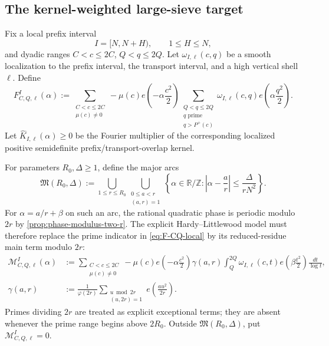 \documentclass[11pt]{article}
\theoremstyle{definition}
\theoremstyle{remark}
\newcommand{\Pplus}{P^{+}}
\newcommand{\1}{\mathbf{1}}
\begin{document}
\subsection{The kernel-weighted large-sieve target}

Fix a local prefix interval
\begin{equation}
 I=[N,N+H),
 \qquad 1\le H\le N,
 \label{eq:local-prefix-I}
\end{equation}
and dyadic ranges $C<c\le2C$, $Q<q\le2Q$.  Let
$\omega_{I,\ell}(c,q)$ be a smooth localization to the prefix interval,
the transport interval, and a high vertical shell $\ell$.  Define
\begin{equation}
 F_{C,Q,\ell}^{I}(\alpha)
 :=
 \sum_{\substack{C<c\le2C\\\mu(c)\ne0}}
 -\mu(c)e\!\left(-\alpha\frac{c^2}{2}\right)
 \sum_{\substack{Q<q\le2Q\\q\text{ prime}\\q>\Pplus(c)}}
 \omega_{I,\ell}(c,q)
 e\!\left(\alpha\frac{q^2}{2}\right).
 \label{eq:F-CQ-local}
\end{equation}
Let $\widehat K_{I,\ell}(\alpha)\ge0$ be the Fourier multiplier of the
corresponding localized positive semidefinite prefix/transport-overlap
kernel.

For parameters $R_0,\Delta\ge1$, define the major arcs
\begin{equation}
 \mathfrak M(R_0,\Delta)
 :=
 \bigcup_{1\le r\le R_0}
 \bigcup_{\substack{0\le a<r\\(a,r)=1}}
 \left\{
 \alpha\in\mathbb R/\mathbb Z:
 \left|\alpha-\frac ar\right|
 \le\frac{\Delta}{rN^2}
 \right\}.
 \label{eq:major-arcs}
\end{equation}
For $\alpha=a/r+\beta$ on such an arc, the rational quadratic phase is
periodic modulo $2r$ by \cref{prop:phase-modulus-two-r}.  The explicit
Hardy--Littlewood model must therefore replace the prime indicator in
\cref{eq:F-CQ-local} by its reduced-residue main term modulo $2r$:
\begin{align}
 \mathcal M_{C,Q,\ell}^{I}(\alpha)
 &:={}
 \sum_{\substack{C<c\le2C\\\mu(c)\ne0}}
 -\mu(c)e\!\left(-\alpha\frac{c^2}{2}\right)
 \gamma(a,r)
 \int_Q^{2Q}
 \omega_{I,\ell}(c,t)
 e\!\left(\beta\frac{t^2}{2}\right)
 \frac{dt}{\log t},
 \label{eq:major-arc-model-corrected}\\
 \gamma(a,r)
 &:={}
 \frac{1}{\varphi(2r)}
 \sum_{\substack{u\bmod 2r\\(u,2r)=1}}
 e\!\left(\frac{au^2}{2r}\right).
 \label{eq:quadratic-Gauss-prime-corrected}
\end{align}
Primes dividing $2r$ are treated as explicit exceptional terms; they are absent
whenever the prime range begins above $2R_0$.  Outside
$\mathfrak M(R_0,\Delta)$, put $\mathcal M_{C,Q,\ell}^{I}=0$.
\end{document}
